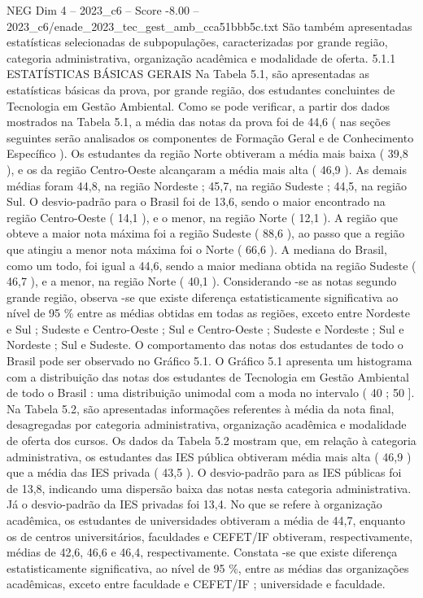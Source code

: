 \begin{textsample}{NEG Dim 4 – 2023\_c6 – Score -8.00 – 2023\_c6/enade\_2023\_tec\_gest\_amb\_cca51bbb5c.txt}
São também apresentadas estatísticas selecionadas de subpopulações, caracterizadas por grande região, categoria administrativa, organização acadêmica e modalidade de oferta. 5.1.1 ESTATÍSTICAS BÁSICAS GERAIS Na Tabela 5.1, são apresentadas as estatísticas básicas da prova, por grande região, dos estudantes concluintes de Tecnologia em Gestão Ambiental.
Como se pode verificar, a partir dos dados mostrados na Tabela 5.1, a média das notas da prova foi de 44,6 ( nas seções seguintes serão analisados os componentes de Formação Geral e de Conhecimento Específico ).
Os estudantes da região Norte obtiveram a média mais baixa ( 39,8 ), e os da região Centro-Oeste alcançaram a média mais alta ( 46,9 ).
As demais médias foram 44,8, na região Nordeste ; 45,7, na região Sudeste ; 44,5, na região Sul.
O desvio-padrão para o Brasil foi de 13,6, sendo o maior encontrado na região Centro-Oeste ( 14,1 ), e o menor, na região Norte ( 12,1 ).
A região que obteve a maior nota máxima foi a região Sudeste ( 88,6 ), ao passo que a região que atingiu a menor nota máxima foi o Norte ( 66,6 ).
A mediana do Brasil, como um todo, foi igual a 44,6, sendo a maior mediana obtida na região Sudeste ( 46,7 ), e a menor, na região Norte ( 40,1 ).
Considerando -se as notas segundo grande região, observa -se que existe diferença estatisticamente significativa ao nível de 95 \% entre as médias obtidas em todas as regiões, exceto entre Nordeste e Sul ; Sudeste e Centro-Oeste ; Sul e Centro-Oeste ; Sudeste e Nordeste ; Sul e Nordeste ; Sul e Sudeste.
O comportamento das notas dos estudantes de todo o Brasil pode ser observado no Gráfico 5.1.
O Gráfico 5.1 apresenta um histograma com a distribuição das notas dos estudantes de Tecnologia em Gestão Ambiental de todo o Brasil : uma distribuição unimodal com a moda no intervalo ( 40 ; 50 ].
Na Tabela 5.2, são apresentadas informações referentes à média da nota final, desagregadas por categoria administrativa, organização acadêmica e modalidade de oferta dos cursos.
Os dados da Tabela 5.2 mostram que, em relação à categoria administrativa, os estudantes das IES pública obtiveram média mais alta ( 46,9 ) que a média das IES privada ( 43,5 ).
O desvio-padrão para as IES públicas foi de 13,8, indicando uma dispersão baixa das notas nesta categoria administrativa.
Já o desvio-padrão da IES privadas foi 13,4.
No que se refere à organização acadêmica, os estudantes de universidades obtiveram a média de 44,7, enquanto os de centros universitários, faculdades e CEFET/IF obtiveram, respectivamente, médias de 42,6, 46,6 e 46,4, respectivamente.
Constata -se que existe diferença estatisticamente significativa, ao nível de 95 \%, entre as médias das organizações acadêmicas, exceto entre faculdade e CEFET/IF ; universidade e faculdade.

\end{textsample}
